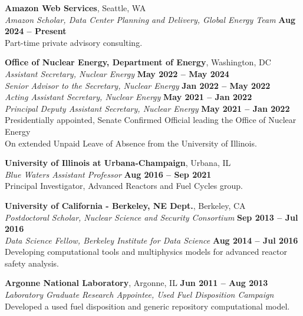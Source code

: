 \documentclass[margin,line]{resume}
\begin{document}
\begin{resume}
    \textbf{Amazon Web Services}, Seattle, WA\\
                \textsl{Amazon Scholar, Data Center Planning and Delivery, Global Energy Team} \hfill \textbf{Aug 2024 -- Present}\\
                Part-time private advisory consulting.

    \textbf{Office of Nuclear Energy, Department of Energy}, Washington, DC\\
                \textsl{Assistant Secretary, Nuclear Energy} \hfill \textbf{May 2022 -- May 2024}\\
                \textsl{Senior Advisor to the Secretary, Nuclear Energy} \hfill \textbf{Jan 2022 -- May 2022}\\
                \textsl{Acting Assistant Secretary, Nuclear Energy} \hfill \textbf{May 2021 -- Jan 2022}\\
                \textsl{Principal Deputy Assistant Secretary, Nuclear Energy} \hfill \textbf{May 2021 -- Jan 2022}\\
                Presidentially appointed, Senate Confirmed Official leading the Office of Nuclear Energy\\
                On extended Unpaid Leave of Absence from the University of Illinois.

    \textbf{University of Illinois at Urbana-Champaign}, Urbana, IL\\
                \textsl{Blue Waters Assistant Professor} \hfill \textbf{Aug 2016 -- Sep 2021}\\
                Principal Investigator, Advanced Reactors and Fuel Cycles group.

    \textbf{University of California - Berkeley, NE Dept.}, Berkeley, CA \\
                \textsl{Postdoctoral Scholar, Nuclear Science and Security Consortium} \hfill \textbf{Sep 2013 -- Jul 2016}\\
                \textsl{Data Science Fellow, Berkeley Institute for Data Science} \hfill \textbf{Aug 2014 -- Jul 2016}\\
                Developing computational tools and multiphysics models for advanced reactor safety analysis.

    \textbf{Argonne National Laboratory}, Argonne, IL \hfill \textbf{Jun 2011 -- Aug 2013}\\
                \textsl{Laboratory Graduate Research Appointee, Used Fuel Disposition Campaign}\\
                Developed a used fuel disposition and generic repository computational model.


\end{resume}
\end{document}
